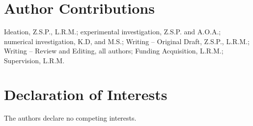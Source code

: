 \documentclass[11pt]{article}
\begin{document}
    \section*{Author Contributions}
    Ideation, Z.S.P., L.R.M.; experimental investigation, Z.S.P. and A.O.A.; numerical investigation, K.D, and M.S.; Writing – Original Draft, Z.S.P., L.R.M.; Writing – Review and Editing, all authors; Funding Acquisition, L.R.M.; Supervision,  L.R.M.

    \section*{Declaration of Interests}
    The authors declare no competing interests.
    
    
    
\end{document}
